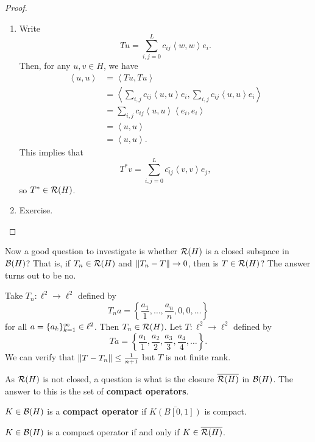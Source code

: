 \documentclass[a4paper]{article}
\renewcommand{\braket}[2]{\left\langle #1, #1 \right\rangle}
\begin{document}
\begin{proof}
  \begin{enumerate}
    \item Write
          \[
            T u = \sum_{i, j = 0}^L c_{ij} \braket{w}{e_j} e_i.
          \]
          Then, for any $u, v \in H$, we have
          \[
            \begin{aligned}
              \braket{u}{T^* v} & = \braket{T u}{v}                                                \\
                                & = \braket{\sum_{i, j} c_{ij} \braket{u}{e_j} e_i}{v}             \\
                                & = \sum_{i, j} c_{ij} \braket{u}{e_j} \braket{e_i}{v}             \\
                                & = \braket{u}{\sum_{i, j} \bar{c_{ij}} \bar{\braket{e_i}{v}} e_j} \\
                                & = \braket{u}{\sum_{i, j} \bar{c_{ij}} \braket{v}{e_i} e_j}.
            \end{aligned}
          \]
          This implies that
          \[
            T^* v = \sum_{i, j = 0}^L \bar{c_{ij}} \braket{v}{e_i} e_j,
          \]
          so $T^* \in \mathcal{R}(H)$.
    \item Exercise.
  \end{enumerate}
\end{proof}

Now a good question to investigate is whether
$\mathcal{R}(H)$ is a closed subspace in $\mathcal{B}(H)$?
That is, if $T_n \in \mathcal{R}(H)$ and $\left\lVert T_n - T\right\rVert \to 0$,
then is $T \in \mathcal{R}(H)$? The answer turns out to be no.

\begin{eg}
  Take $T_n : \ell^2 \to \ell^2$ defined by
  \[
    T_n a = \left\{ \frac{a_1}{1}, \dots, \frac{a_n}{n}, 0,
    0, \dots \right\}
  \]
  for all $a = \{ a_k \}_{k=1}^\infty \in \ell^2$. Then $T_n
    \in \mathcal{R}(H)$. Let $T : \ell^2 \to \ell^2$ defined
  by
  \[
    T a = \left\{ \frac{a_1}{1}, \frac{a_2}{2},
    \frac{a_3}{3}, \frac{a_4}{4}, \dots \right\}.
  \]
  We can verify that $\left\lVert T - T_n\right\rVert \leq \frac{1}{n + 1}$
  but $T$ is not finite rank.
\end{eg}

As $\mathcal{R}(H)$ is not closed, a question is what is
the closure $\overline{\mathcal{R}(H)}$ in $\mathcal{B}(H)$. The answer to
this is the set of \textbf{compact operators}.

\begin{defi}
  $K \in \mathcal{B}(H)$ is a \textbf{compact operator}
  if $\bar{K(B[0, 1])}$ is compact.
\end{defi}

\begin{thm}
  $K \in \mathcal{B}(H)$ is a compact operator if and only if
  $K \in \overline{\mathcal{R}(H)}$.
\end{thm}
\end{document}
